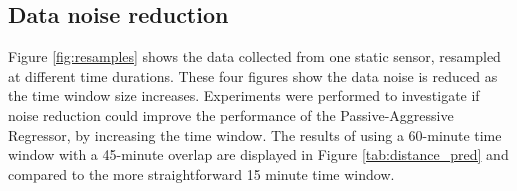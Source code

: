 \subsection{Data noise reduction}

Figure \ref{fig:resamples} shows the data collected from one static sensor, resampled at different time durations. These four figures show the data noise is reduced as the time window size increases. Experiments were performed to investigate if noise reduction could improve the performance of the Passive-Aggressive Regressor, by increasing the time window. The results of using a 60-minute time window with a 45-minute overlap are displayed in Figure \ref{tab:distance_pred} and compared to the more straightforward 15 minute time window.

\begin{figure}
\centering


\end{figure}
